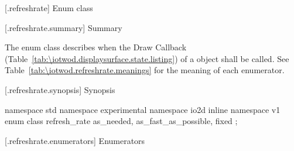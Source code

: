  [\iotwod.refreshrate] {Enum class }

 [\iotwod.refreshrate.summary] { Summary}

\pnum
The  enum class describes when the Draw Callback (Table~\ref{tab:\iotwod.displaysurface.state.listing}) of a  object shall be called. See Table~\ref{tab:\iotwod.refreshrate.meanings} for the meaning of each \tcode{} enumerator.

 [\iotwod.refreshrate.synopsis] { Synopsis}

\begin{codeblock}
namespace std { namespace experimental { namespace io2d { inline namespace v1 {
  enum class refresh_rate {
    as_needed,
    as_fast_as_possible,
    fixed
  };
} } } }
\end{codeblock}

 [\iotwod.refreshrate.enumerators] { Enumerators}

